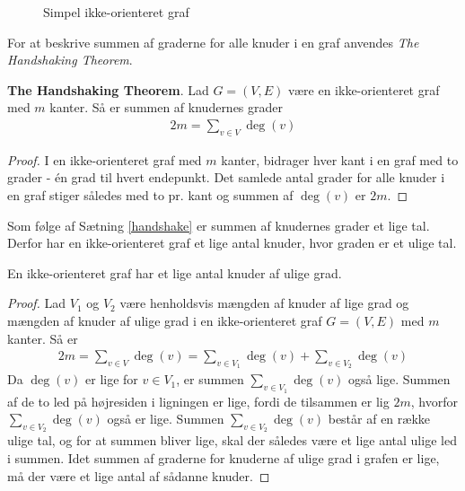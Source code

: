 \begin{figure}[h]
	\centering
	
	\caption{Simpel ikke-orienteret graf} \label{eksempel_nabo}
\end{figure}

For at beskrive summen af graderne for alle knuder i en graf anvendes \textit{The Handshaking Theorem}. 

\begin{thm}\label{handshake}
	\textbf{The Handshaking Theorem}.
	Lad $G=(V,E)$ være en ikke-orienteret graf med $m$ kanter.
	Så er summen af knudernes grader
	\begin{align*}
		2m=\sum_{v \in V}\deg(v)
	\end{align*}
\end{thm}

\begin{proof}
	I en ikke-orienteret graf med $m$ kanter, bidrager hver kant i en graf med to grader - én grad til hvert endepunkt.
	Det samlede antal grader for alle knuder i en graf stiger således med to pr. kant og summen af $\deg(v)$ er $2m$. 
\end{proof}

Som følge af Sætning \ref{handshake} er summen af knudernes grader et lige tal.
Derfor har en ikke-orienteret graf et lige antal knuder, hvor graden er et ulige tal.

\begin{thm}
	En ikke-orienteret graf har et lige antal knuder af ulige grad.
\end{thm}

\begin{proof}
	Lad $V_1$ og $V_2$ være henholdsvis mængden af knuder af lige grad og mængden af knuder af ulige grad i en ikke-orienteret graf $G=(V,E)$ med $m$ kanter.
	Så er
	\begin{align*}
		2m=\sum_{v \in V}\deg(v)=\sum_{v \in V_1}\deg(v)+ \sum_{v \in V_2}\deg(v)
	\end{align*}
	Da $\deg(v)$ er lige for $v \in V_1$, er summen $\sum_{v \in V_1}\deg(v)$ også lige.
	Summen af de to led på højresiden i ligningen er lige, fordi de tilsammen er lig $2m$, hvorfor $\sum_{v \in V_2}\deg(v)$ også er lige.
	Summen $\sum_{v \in V_2}\deg(v)$ består af en række ulige tal, og for at summen bliver lige, skal der således være et lige antal ulige led i summen.
	Idet summen af graderne for knuderne af ulige grad i grafen er lige, må der være et lige antal af sådanne knuder.
\end{proof}

